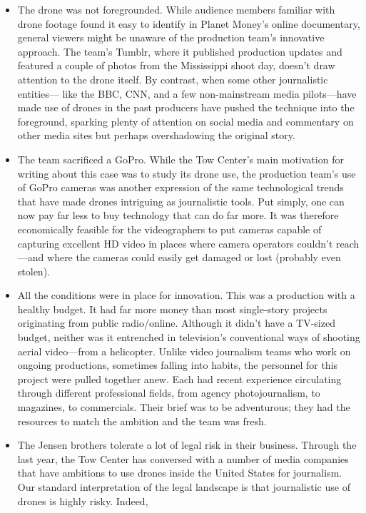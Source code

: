 \begin{itemize}
\item The drone was not foregrounded.
While audience members familiar with drone footage found it easy to
identify in Planet Money's online documentary, general viewers might
be unaware of the production team's innovative approach. The team's
Tumblr, where it published production updates and featured a couple
of photos from the Mississippi shoot day, doesn't draw attention to
the drone itself. By contrast, when some other journalistic entities—
like the BBC, CNN, and a few non-mainstream media pilots—have
made use of drones in the past producers have pushed the technique
into the foreground, sparking plenty of attention on social media and
commentary on other media sites but perhaps overshadowing the
original story.
\item The team sacrificed a GoPro.
While the Tow Center's main motivation for writing about this case
was to study its drone use, the production team's use of GoPro cameras
was another expression of the same technological trends that
have made drones intriguing as journalistic tools. Put simply, one can
now pay far less to buy technology that can do far more. It was therefore
economically feasible for the videographers to put cameras capable
of capturing excellent HD video in places where camera operators
couldn't reach—and where the cameras could easily get damaged or
lost (probably even stolen).
\item All the conditions were in place for innovation.
This was a production with a healthy budget. It had far more money
than most single-story projects originating from public radio/online.
Although it didn't have a TV-sized budget, neither was it entrenched
in television's conventional ways of shooting aerial video—from a
helicopter. Unlike video journalism teams who work on ongoing productions,
sometimes falling into habits, the personnel for this project
were pulled together anew. Each had recent experience circulating
through different professional fields, from agency photojournalism,
to magazines, to commercials. Their brief was to be adventurous; they
had the resources to match the ambition and the team was fresh.
\item The Jensen brothers tolerate a lot of legal risk in their business.
Through the last year, the Tow Center has conversed with a number
of media companies that have ambitions to use drones inside the
United States for journalism. Our standard interpretation of the legal
landscape is that journalistic use of drones is highly risky. Indeed,

\end{itemize}
